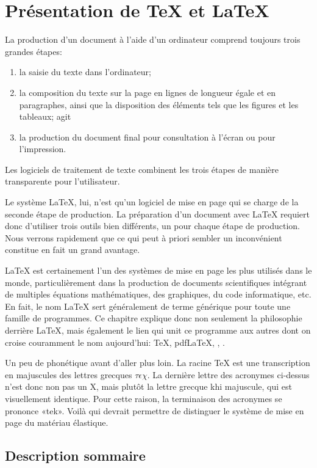 \chapter{Présentation de {\TeX} et {\LaTeX}}
\label{chap:presentation}

La production d'un document à l'aide d'un ordinateur comprend toujours
trois grandes étapes:
\begin{enumerate}
\item la saisie du texte dans l'ordinateur;
\item la composition du texte sur la page en lignes de longueur égale
  et en paragraphes, ainsi que la disposition des éléments tels que les
  figures et les tableaux;
agit\item la production du document final pour consultation à l'écran ou
  pour l'impression.
\end{enumerate}
Les logiciels de traitement de texte combinent les trois étapes de
manière transparente pour l'utilisateur.

Le système {\LaTeX}, lui, n'est qu'un logiciel de mise en page qui se
charge de la seconde étape de production. La préparation d'un document
avec {\LaTeX} requiert donc d'utiliser trois outils bien différents,
un pour chaque étape de production. Nous verrons rapidement que ce qui
peut à priori sembler un inconvénient constitue en fait un grand
avantage.

{\LaTeX} est certainement l'un des systèmes de mise en page les plus
utilisés dans le monde, particulièrement dans la production de
documents scientifiques intégrant de multiples équations
mathématiques, des graphiques, du code informatique, etc. En fait, le
nom {\LaTeX} sert généralement de terme générique pour toute une
famille de programmes. Ce chapitre explique donc non seulement la
philosophie derrière {\LaTeX}, mais également le lien qui unit ce
programme aux autres dont on croise couramment le nom aujourd'hui:
{\TeX}, pdf{\LaTeX}, {\XeLaTeX}, {\LuaLaTeX}.

Un peu de phonétique avant d'aller plus loin. La racine {\TeX} est une
transcription en majuscules des lettres grecques $\tau\epsilon\chi$.
La dernière lettre des acronymes ci-dessus n'est donc non pas un X,
mais plutôt la lettre grecque khi majuscule, qui est visuellement
identique. Pour cette raison, la terminaison des acronymes se prononce
«tek». Voilà qui devrait permettre de distinguer le système de mise en
page du matériau élastique.


\section{Description sommaire}
\label{sec:presentation:description}

